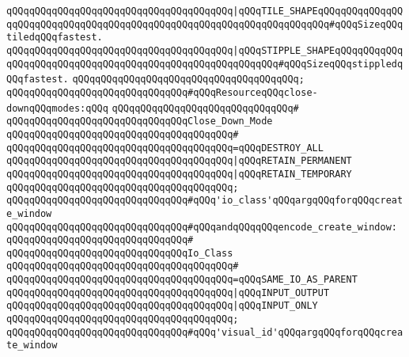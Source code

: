 \verb|qQQqqQQqqQQqqQQqqQQqqQQqqQQqqQQqqQQqqQQq|\verb#|qQQqTILE_SHAPEqQQqqQQqqQQqqQQqqQQqqQQqqQQqqQQqqQQqqQQqqQQqqQQqqQQqqQQqqQQqqQQqqQQqqQQq#\verb|#qQQqSizeqQQqtiledqQQqfastest.|\newline
\verb|qQQqqQQqqQQqqQQqqQQqqQQqqQQqqQQqqQQqqQQq|\verb#|qQQqSTIPPLE_SHAPEqQQqqQQqqQQqqQQqqQQqqQQqqQQqqQQqqQQqqQQqqQQqqQQqqQQqqQQqqQQq#\verb|#qQQqSizeqQQqstippledqQQqfastest.|\newline
\verb|qQQqqQQqqQQqqQQqqQQqqQQqqQQqqQQqqQQqqQQq;|\newline
\newline
\verb|qQQqqQQqqQQqqQQqqQQqqQQqqQQqqQQq#qQQqResourceqQQqclose-downqQQqmodes:qQQq|\newline
\verb|qQQqqQQqqQQqqQQqqQQqqQQqqQQqqQQq#|\newline
\verb|qQQqqQQqqQQqqQQqqQQqqQQqqQQqqQQqClose_Down_Mode|\newline
\verb|qQQqqQQqqQQqqQQqqQQqqQQqqQQqqQQqqQQqqQQq#|\newline
\verb|qQQqqQQqqQQqqQQqqQQqqQQqqQQqqQQqqQQqqQQq=qQQqDESTROY_ALL|\newline
\verb|qQQqqQQqqQQqqQQqqQQqqQQqqQQqqQQqqQQqqQQq|\verb#|qQQqRETAIN_PERMANENT#\newline
\verb|qQQqqQQqqQQqqQQqqQQqqQQqqQQqqQQqqQQqqQQq|\verb#|qQQqRETAIN_TEMPORARY#\newline
\verb|qQQqqQQqqQQqqQQqqQQqqQQqqQQqqQQqqQQqqQQq;|\newline
\newline
\verb|qQQqqQQqqQQqqQQqqQQqqQQqqQQqqQQq#qQQq'io_class'qQQqargqQQqforqQQqcreate_window|\newline
\verb|qQQqqQQqqQQqqQQqqQQqqQQqqQQqqQQq#qQQqandqQQqqQQqencode_create_window:|\newline
\verb|qQQqqQQqqQQqqQQqqQQqqQQqqQQqqQQq#|\newline
\verb|qQQqqQQqqQQqqQQqqQQqqQQqqQQqqQQqIo_Class|\newline
\verb|qQQqqQQqqQQqqQQqqQQqqQQqqQQqqQQqqQQqqQQq#|\newline
\verb|qQQqqQQqqQQqqQQqqQQqqQQqqQQqqQQqqQQqqQQq=qQQqSAME_IO_AS_PARENT|\newline
\verb|qQQqqQQqqQQqqQQqqQQqqQQqqQQqqQQqqQQqqQQq|\verb#|qQQqINPUT_OUTPUT#\newline
\verb|qQQqqQQqqQQqqQQqqQQqqQQqqQQqqQQqqQQqqQQq|\verb#|qQQqINPUT_ONLY#\newline
\verb|qQQqqQQqqQQqqQQqqQQqqQQqqQQqqQQqqQQqqQQq;|\newline
\newline
\verb|qQQqqQQqqQQqqQQqqQQqqQQqqQQqqQQq#qQQq'visual_id'qQQqargqQQqforqQQqcreate_window|\newline
